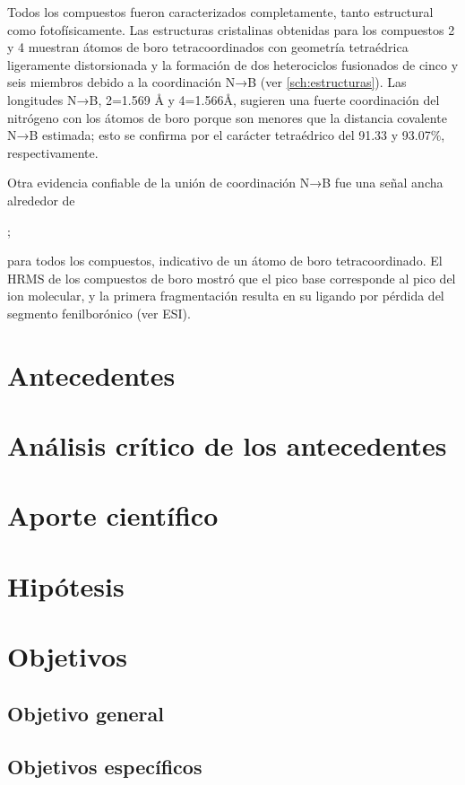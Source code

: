 \documentclass[spanish,mexico]{scrartcl}
\begin{document}
Todos los compuestos fueron caracterizados completamente, tanto estructural como fotofísicamente. Las estructuras cristalinas obtenidas para los compuestos 2 y 4 muestran átomos de boro tetracoordinados con geometría tetraédrica ligeramente distorsionada y la formación de dos heterociclos fusionados de cinco y seis miembros debido a la coordinación N→B (ver \cref{sch:estructuras}). Las longitudes N→B, 2=1.569 Å y 4=1.566Å, sugieren una fuerte coordinación del nitrógeno con los átomos de boro porque son menores que la distancia covalente N→B estimada; esto se confirma por el carácter tetraédrico del 91.33 y 93.07\%, respectivamente.

Otra evidencia confiable de la unión de coordinación N→B fue una señal ancha alrededor de \begin{experimental}  ; \end{experimental} para todos los compuestos, indicativo de un átomo de boro tetracoordinado. El HRMS de los compuestos de boro mostró que el pico base corresponde al pico del ion molecular, y la primera fragmentación resulta en su ligando por pérdida del segmento fenilborónico (ver ESI).


\section{Antecedentes}

\Blindtext[2]
\section{Análisis crítico de los antecedentes}
\Blindtext
\section{Aporte científico}
\blindtext
\section{Hipótesis}
\blindtext
\section{Objetivos}
\subsection{Objetivo general}
\blindtext
\subsection{Objetivos específicos}
\end{document}
